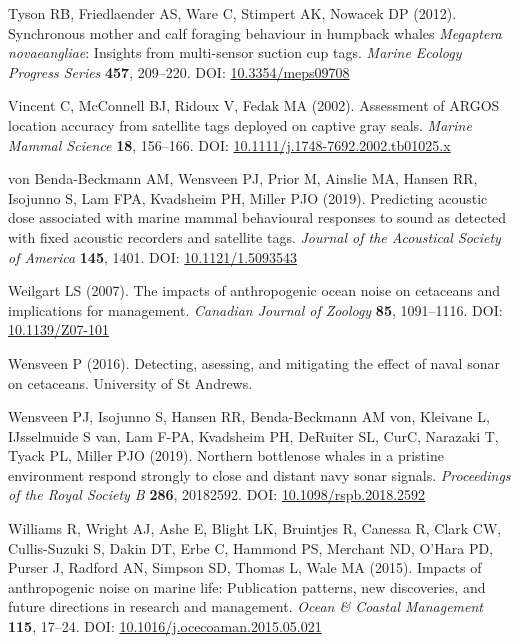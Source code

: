 \documentclass[
]{article}
\begin{document}
\leavevmode\hypertarget{ref-Tyson2012}{}%
Tyson RB, Friedlaender AS, Ware C, Stimpert AK, Nowacek DP (2012). Synchronous mother and calf foraging behaviour in humpback whales \emph{Megaptera novaeangliae}: Insights from multi-sensor suction cup tags. \emph{Marine Ecology Progress Series} \textbf{457}, 209--220. DOI: \href{https://doi.org/10.3354/meps09708}{10.3354/meps09708}

\leavevmode\hypertarget{ref-Vincent2002}{}%
Vincent C, McConnell BJ, Ridoux V, Fedak MA (2002). Assessment of ARGOS location accuracy from satellite tags deployed on captive gray seals. \emph{Marine Mammal Science} \textbf{18}, 156--166. DOI: \href{https://doi.org/10.1111/j.1748-7692.2002.tb01025.x}{10.1111/j.1748-7692.2002.tb01025.x}

\leavevmode\hypertarget{ref-vonBendaBeckmann2019}{}%
von Benda-Beckmann AM, Wensveen PJ, Prior M, Ainslie MA, Hansen RR, Isojunno S, Lam FPA, Kvadsheim PH, Miller PJO (2019). Predicting acoustic dose associated with marine mammal behavioural responses to sound as detected with fixed acoustic recorders and satellite tags. \emph{Journal of the Acoustical Society of America} \textbf{145}, 1401. DOI: \href{https://doi.org/10.1121/1.5093543}{10.1121/1.5093543}

\leavevmode\hypertarget{ref-Weilgart2007}{}%
Weilgart LS (2007). The impacts of anthropogenic ocean noise on cetaceans and implications for management. \emph{Canadian Journal of Zoology} \textbf{85}, 1091--1116. DOI: \href{https://doi.org/10.1139/Z07-101}{10.1139/Z07-101}

\leavevmode\hypertarget{ref-Wensveen2016}{}%
Wensveen P (2016). Detecting, asessing, and mitigating the effect of naval sonar on cetaceans. University of St Andrews.

\leavevmode\hypertarget{ref-Wensveen2019}{}%
Wensveen PJ, Isojunno S, Hansen RR, Benda-Beckmann AM von, Kleivane L, IJsselmuide S van, Lam F-PA, Kvadsheim PH, DeRuiter SL, Cur\ifmmode{}\fi C, Narazaki T, Tyack PL, Miller PJO (2019). Northern bottlenose whales in a pristine environment respond strongly to close and distant navy sonar signals. \emph{Proceedings of the Royal Society B} \textbf{286}, 20182592. DOI: \href{https://doi.org/10.1098/rspb.2018.2592}{10.1098/rspb.2018.2592}

\leavevmode\hypertarget{ref-Williams2015}{}%
Williams R, Wright AJ, Ashe E, Blight LK, Bruintjes R, Canessa R, Clark CW, Cullis-Suzuki S, Dakin DT, Erbe C, Hammond PS, Merchant ND, O'Hara PD, Purser J, Radford AN, Simpson SD, Thomas L, Wale MA (2015). Impacts of anthropogenic noise on marine life: Publication patterns, new discoveries, and future directions in research and management. \emph{Ocean \& Coastal Management} \textbf{115}, 17--24. DOI: \href{https://doi.org/10.1016/j.ocecoaman.2015.05.021}{10.1016/j.ocecoaman.2015.05.021}
\end{document}
